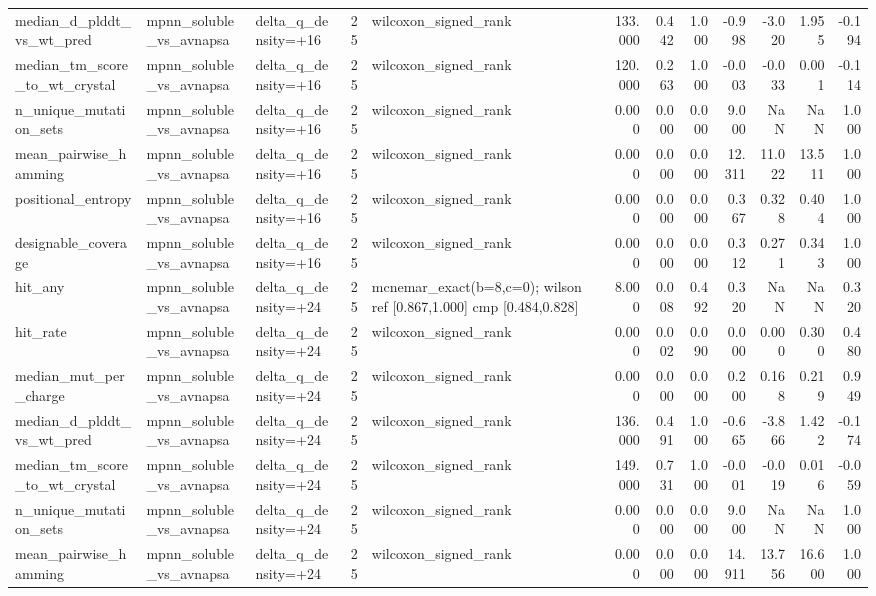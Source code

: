 \begin{table}
{\begin{tabular}{lllrlrrrrrrr}
median\_d\_plddt\_vs\_wt\_pred & mpnn\_soluble\_vs\_avnapsa & delta\_q\_density=+16 & 25 & wilcoxon\_signed\_rank & 133.000 & 0.442 & 1.000 & -0.998 & -3.020 & 1.955 & -0.194 \\
median\_tm\_score\_to\_wt\_crystal & mpnn\_soluble\_vs\_avnapsa & delta\_q\_density=+16 & 25 & wilcoxon\_signed\_rank & 120.000 & 0.263 & 1.000 & -0.003 & -0.033 & 0.001 & -0.114 \\
n\_unique\_mutation\_sets & mpnn\_soluble\_vs\_avnapsa & delta\_q\_density=+16 & 25 & wilcoxon\_signed\_rank & 0.000 & 0.000 & 0.000 & 9.000 & NaN & NaN & 1.000 \\
mean\_pairwise\_hamming & mpnn\_soluble\_vs\_avnapsa & delta\_q\_density=+16 & 25 & wilcoxon\_signed\_rank & 0.000 & 0.000 & 0.000 & 12.311 & 11.022 & 13.511 & 1.000 \\
positional\_entropy & mpnn\_soluble\_vs\_avnapsa & delta\_q\_density=+16 & 25 & wilcoxon\_signed\_rank & 0.000 & 0.000 & 0.000 & 0.367 & 0.328 & 0.404 & 1.000 \\
designable\_coverage & mpnn\_soluble\_vs\_avnapsa & delta\_q\_density=+16 & 25 & wilcoxon\_signed\_rank & 0.000 & 0.000 & 0.000 & 0.312 & 0.271 & 0.343 & 1.000 \\
hit\_any & mpnn\_soluble\_vs\_avnapsa & delta\_q\_density=+24 & 25 & mcnemar\_exact(b=8,c=0); wilson ref [0.867,1.000] cmp [0.484,0.828] & 8.000 & 0.008 & 0.492 & 0.320 & NaN & NaN & 0.320 \\
hit\_rate & mpnn\_soluble\_vs\_avnapsa & delta\_q\_density=+24 & 25 & wilcoxon\_signed\_rank & 0.000 & 0.002 & 0.090 & 0.000 & 0.000 & 0.300 & 0.480 \\
median\_mut\_per\_charge & mpnn\_soluble\_vs\_avnapsa & delta\_q\_density=+24 & 25 & wilcoxon\_signed\_rank & 0.000 & 0.000 & 0.000 & 0.200 & 0.168 & 0.219 & 0.949 \\
median\_d\_plddt\_vs\_wt\_pred & mpnn\_soluble\_vs\_avnapsa & delta\_q\_density=+24 & 25 & wilcoxon\_signed\_rank & 136.000 & 0.491 & 1.000 & -0.665 & -3.866 & 1.422 & -0.174 \\
median\_tm\_score\_to\_wt\_crystal & mpnn\_soluble\_vs\_avnapsa & delta\_q\_density=+24 & 25 & wilcoxon\_signed\_rank & 149.000 & 0.731 & 1.000 & -0.001 & -0.019 & 0.016 & -0.059 \\
n\_unique\_mutation\_sets & mpnn\_soluble\_vs\_avnapsa & delta\_q\_density=+24 & 25 & wilcoxon\_signed\_rank & 0.000 & 0.000 & 0.000 & 9.000 & NaN & NaN & 1.000 \\
mean\_pairwise\_hamming & mpnn\_soluble\_vs\_avnapsa & delta\_q\_density=+24 & 25 & wilcoxon\_signed\_rank & 0.000 & 0.000 & 0.000 & 14.911 & 13.756 & 16.600 & 1.000 \\

\end{tabular}}
\end{table}
